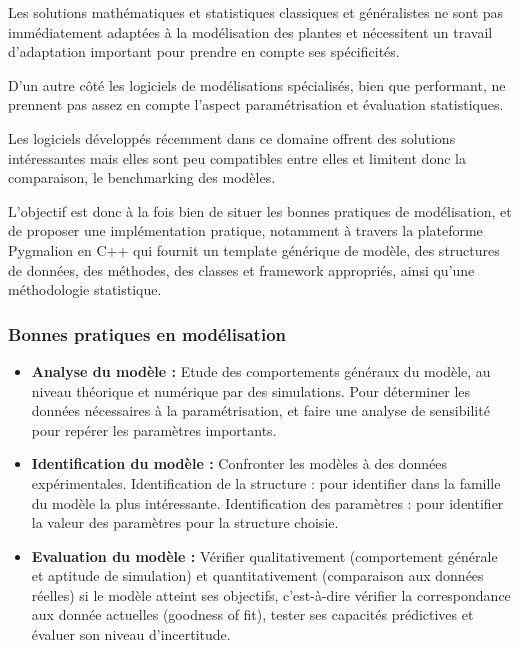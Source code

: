 Les solutions mathématiques et statistiques classiques et généralistes ne sont pas immédiatement adaptées à la modélisation des plantes et nécessitent un travail d’adaptation important pour prendre en compte ses spécificités.

D’un autre côté les logiciels de modélisations spécialisés, bien que performant, ne prennent pas assez en compte l’aspect paramétrisation et évaluation statistiques.

Les logiciels développés récemment dans ce domaine offrent des solutions intéressantes mais elles sont peu compatibles entre elles et limitent donc la comparaison, le benchmarking des modèles.

L’objectif est donc à la fois bien de situer les bonnes pratiques de modélisation, et de proposer une implémentation pratique, notamment à travers la plateforme Pygmalion en C++ qui fournit un template générique de modèle, des structures de données, des méthodes, des classes et framework appropriés, ainsi qu’une méthodologie statistique.

\subsubsection{Bonnes pratiques en modélisation}

\begin{itemize}

\item \textbf{Analyse du modèle :} Etude des comportements généraux du modèle, au niveau théorique et numérique par des simulations. Pour déterminer les données nécessaires à la paramétrisation, et faire une analyse de sensibilité pour repérer les paramètres importants.
\item \textbf{Identification du modèle :} Confronter les modèles à des données expérimentales. Identification de la structure : pour identifier dans la famille du modèle la plus intéressante. Identification des paramètres : pour identifier la valeur des paramètres pour la structure choisie.
\item \textbf{Evaluation du modèle :} Vérifier qualitativement (comportement générale et aptitude de simulation) et quantitativement (comparaison aux données réelles) si le modèle atteint ses objectifs, c’est-à-dire vérifier la correspondance aux donnée actuelles (goodness of fit), tester ses capacités prédictives et évaluer son niveau d’incertitude.

\end{itemize}

